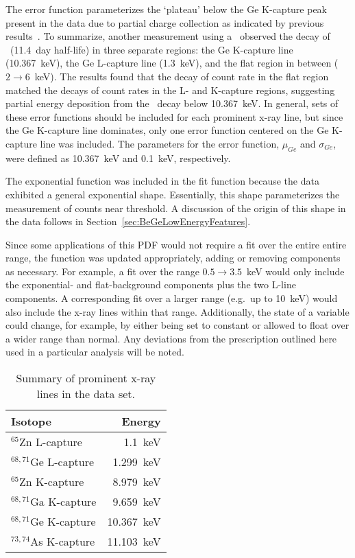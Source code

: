 The error function parameterizes the `plateau' below the Ge K-capture peak present in the data due to partial charge collection as indicated by previous results~\cite{Barbeau:2009fk}.  To summarize, another measurement using a \ppc~observed the decay of \gersevenone~(11.4~day half-life) in three separate regions: the Ge K-capture line (10.367~keV), the Ge L-capture line (1.3~keV), and the flat region in between ($2\to6$~keV).  The results found that the decay of count rate in the flat region matched the decays of count rates in the L- and K-capture regions, suggesting partial energy deposition from the \gersevenone~decay below 10.367~keV.  In general, sets of these error functions should be included for each prominent x-ray line, but since the Ge K-capture line dominates, only one error function centered on the Ge K-capture line was included.  The parameters for the error function, $\mu_{Ge}$ and $\sigma_{Ge}$, were defined as 10.367~keV and 0.1~keV, respectively.  

The exponential function was included in the fit function because the data exhibited a general exponential shape.  Essentially, this shape parameterizes the measurement of counts near threshold.  A discussion of the origin of this shape in the data follows in Section~\ref{sec:BeGeLowEnergyFeatures}.  

Since some applications of this PDF would not require a fit over the entire entire range, the function was updated appropriately, adding or removing components as necessary.  For example, a fit over the range $0.5\to3.5$~keV would only include the exponential- and flat-background components plus the two L-line components.  A corresponding fit over a larger range (e.g.~up to 10~keV) would also include the x-ray lines within that range.  Additionally, the state of a variable could change, for example, by either being set to constant or allowed to float over a wider range than normal.  Any deviations from the prescription outlined here used in a particular analysis will be noted.  

			\begin{table}
			\centering
				\begin{tabular}{l r}
					\toprule
					Isotope & Energy \\
					\midrule
					$^{65}$Zn L-capture & 1.1~keV \\
					$^{68,71}$Ge L-capture & 1.299~keV \\
					$^{65}$Zn K-capture & 8.979~keV \\
					$^{68,71}$Ga K-capture & 9.659~keV \\
					$^{68,71}$Ge K-capture & 10.367~keV \\
					$^{73,74}$As K-capture & 11.103~keV \\
					\bottomrule
				\end{tabular}	
				\caption[Summary of prominent x-ray lines in the \bege~data set]
				{Summary of prominent x-ray lines in the data set.}
				\label{tab:XRayLines}
			\end{table}	
	

